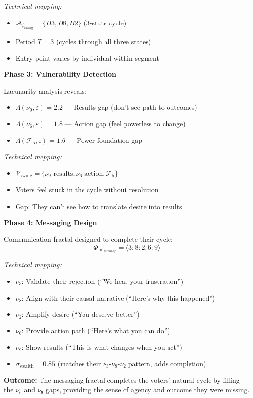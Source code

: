 \documentclass[11pt,twoside]{book}
\newcommand{\noe}[1]{\nu_{#1}}
\newcommand{\Foundations}{\mathcal{F}}
\newcommand{\Lacunarity}{\Lambda}
\newcommand{\PsychAttractor}{\mathcal{A}_\psi}
\newcommand{\ManipFrac}{\Phi_{\mathrm{int}}}
\newcommand{\VulnSet}{\mathcal{V}}
\newcommand{\StealthFactor}{\sigma_{\mathrm{stealth}}}
\begin{document}
\begin{tcolorbox}[colback=yellow!5!white,colframe=yellow!65!black,title=\textbf{Scenario 3: Political Application --- Voter Sentiment Analysis},breakable]
\textit{Technical mapping:}
\begin{itemize}
    \item $\PsychAttractor_{\mathrm{swing}} = \{B3, B8, B2\}$ (3-state cycle)
    \item Period $T = 3$ (cycles through all three states)
    \item Entry point varies by individual within segment
\end{itemize}

\textbf{Phase 3: Vulnerability Detection}

Lacunarity analysis reveals:
\begin{itemize}
    \item $\Lacunarity(\noe{9}, \varepsilon) = 2.2$ --- Results gap (don't see path to outcomes)
    \item $\Lacunarity(\noe{6}, \varepsilon) = 1.8$ --- Action gap (feel powerless to change)
    \item $\Lacunarity(\Foundations_5, \varepsilon) = 1.6$ --- Power foundation gap
\end{itemize}

\textit{Technical mapping:}
\begin{itemize}
    \item $\VulnSet_{\mathrm{swing}} = \{\noe{9}\text{-results}, \noe{6}\text{-action}, \Foundations_5\}$
    \item Voters feel stuck in the cycle without resolution
    \item Gap: They can't see how to translate desire into results
\end{itemize}

\textbf{Phase 4: Messaging Design}

Communication fractal designed to complete their cycle:
\[
    \ManipFrac_{\mathrm{message}} = \langle 3:8:2:6:9 \rangle
\]

\textit{Technical mapping:}
\begin{itemize}
    \item $\noe{3}$: Validate their rejection (``We hear your frustration'')
    \item $\noe{8}$: Align with their causal narrative (``Here's why this happened'')
    \item $\noe{2}$: Amplify desire (``You deserve better'')
    \item $\noe{6}$: Provide action path (``Here's what you can do'')
    \item $\noe{9}$: Show results (``This is what changes when you act'')
    \item $\StealthFactor = 0.85$ (matches their $\noe{3}$-$\noe{8}$-$\noe{2}$ pattern, adds completion)
\end{itemize}

\textbf{Outcome:}
The messaging fractal completes the voters' natural cycle by filling the $\noe{6}$ and $\noe{9}$
gaps, providing the sense of agency and outcome they were missing.

\end{tcolorbox}
\end{document}
